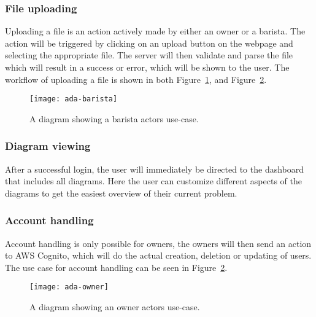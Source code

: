 \subsubsection{File uploading}\label{subsubsec:file_uploading_usecase}

Uploading a file is an action actively made by either an owner or a barista.
The action will be triggered by clicking on an upload button on the webpage and selecting the appropriate file.
The server will then validate and parse the file which will result in a success or error,
which will be shown to the user.
The workflow of uploading a file is shown in both Figure~\ref{fig:barista-conditional},
and Figure~\ref{fig:owner-conditional}.

\begin{figure}[H]
    \centering
    \texttt{[image: ada-barista]}
    \caption{A diagram showing a barista actors use-case.
    }\label{fig:barista-conditional}
\end{figure}

\subsubsection{Diagram viewing}\label{subsubsec:diagram_viewing_usecase}

After a successful login, the user will immediately be directed to the dashboard that includes all diagrams.
Here the user can customize different aspects of the diagrams to get the easiest overview of their current problem.

\subsubsection{Account handling}\label{subsubsec:account_handling_usecase}

Account handling is only possible for owners, the owners will then send an action to AWS Cognito, which will
do the actual creation, deletion or updating of users.
The use case for account handling can be seen in Figure~\ref{fig:owner-conditional}.

\begin{figure}[H]
    \centering
    \texttt{[image: ada-owner]}
    \caption{A diagram showing an owner actors use-case.
    }\label{fig:owner-conditional}
\end{figure}
